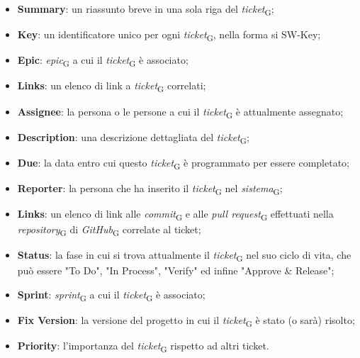 \begin{itemize}
    \item \textbf{Summary}: un riassunto breve in una sola riga del \textit{ticket}\textsubscript{G};
    \item \textbf{Key}: un identificatore unico per ogni \textit{ticket}\textsubscript{G}, nella forma si SW-Key;
    \item \textbf{Epic}: \textit{epic}\textsubscript{G} a cui il \textit{ticket}\textsubscript{G} è associato;
    \item \textbf{Links}: un elenco di link a \textit{ticket}\textsubscript{G} correlati;
    \item \textbf{Assignee}: la persona o le persone a cui il \textit{ticket}\textsubscript{G} è attualmente assegnato;
    \item \textbf{Description}: una descrizione dettagliata del \textit{ticket}\textsubscript{G};
    \item \textbf{Due}: la data entro cui questo \textit{ticket}\textsubscript{G} è programmato per essere completato;
    \item \textbf{Reporter}: la persona che ha inserito il \textit{ticket}\textsubscript{G} nel \textit{sistema}\textsubscript{G};
    \item \textbf{Links}: un elenco di link alle \textit{commit}\textsubscript{G} e alle \textit{pull request}\textsubscript{G} effettuati nella \textit{repository}\textsubscript{G} di \textit{GitHub}\textsubscript{G} correlate al ticket;
    \item \textbf{Status}: la fase in cui si trova attualmente il \textit{ticket}\textsubscript{G} nel suo ciclo di vita, che può essere "To Do", "In Process", "Verify" ed infine "Approve \& Release";
    \item \textbf{Sprint}: \textit{sprint}\textsubscript{G} a cui il \textit{ticket}\textsubscript{G} è associato;
    \item \textbf{Fix Version}: la versione del progetto in cui il \textit{ticket}\textsubscript{G} è stato (o sarà) risolto;
    \item \textbf{Priority}: l'importanza del \textit{ticket}\textsubscript{G} rispetto ad altri ticket.
\end{itemize}
